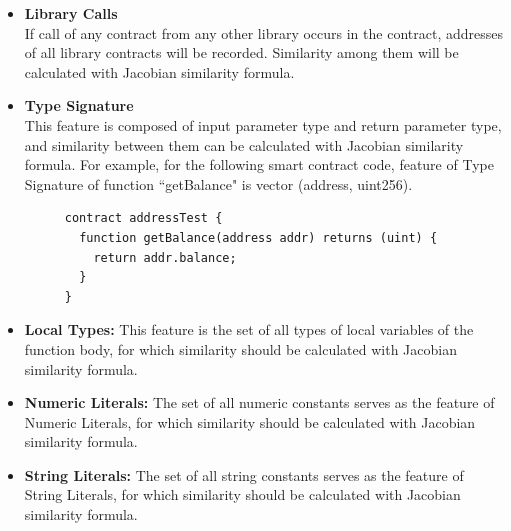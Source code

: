 \begin{itemize}
	\item \textbf{Library Calls} \\ 
	If call of any contract from any other library occurs in the contract, addresses of all library contracts will be recorded. Similarity among them will be calculated with Jacobian similarity formula.
	
	\item \textbf{Type Signature} \\
	This feature is composed of input parameter type and return parameter type, and similarity between them can be calculated with Jacobian similarity formula. For example, for the following smart contract code, feature of Type Signature of function ``getBalance" is vector (address, uint256). \\
	
	\begin{figure}[h]
  	\centering
  	\begin{minipage}{.7\linewidth}
	\begin{lstlisting}[frame=single]
contract addressTest {
  function getBalance(address addr) returns (uint) {
  	return addr.balance;
  }
}
	\end{lstlisting}
  	\end{minipage}
	\end{figure}

	\item \textbf{Local Types:} This feature is the set of all types of local variables of the function body, for which similarity should be calculated with Jacobian similarity formula.
	
	\item \textbf{Numeric Literals:} The set of all numeric constants serves as the feature of Numeric Literals, for which similarity should be calculated with Jacobian similarity formula.
	
	\item \textbf{String Literals:} The set of all string constants serves as the feature of String Literals, for which similarity should be calculated with Jacobian similarity formula.
\end{itemize}

